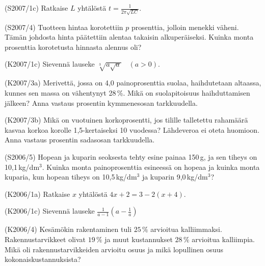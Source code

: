 \begin{tehtava}(S2007/1c)  Ratkaise $L$ yhtälöstä $t=\frac{1}{2\pi\sqrt{LC}}$.
\end{tehtava}

\begin{tehtava}(S2007/4)   Tuotteen hintaa korotettiin $p$ prosenttia, jolloin menekki väheni. Tämän johdosta hinta päätettiin alentaa takaisin alkuperäiseksi. Kuinka monta prosenttia korotetusta hinnasta alennus oli?
\end{tehtava}

\begin{tehtava}(K2007/1c)  Sievennä lauseke $ \sqrt[3]{a \sqrt{a}} \quad (a > 0) $.
\end{tehtava}

\begin{tehtava}(K2007/3a)  Merivettä, jossa on 4,0 painoprosenttia suolaa, haihdutetaan altaassa, kunnes sen massa on vähentynyt 28\,\%. Mikä on suolapitoisuus haihduttamisen jälkeen? Anna vastaus prosentin kymmenesosan tarkkuudella. 
\end{tehtava}

\begin{tehtava}(K2007/3b)  Mikä on vuotuinen korkoprosentti, jos tilille talletettu rahamäärä
                        kasvaa korkoa korolle 1,5-kertaiseksi 10 vuodessa? Lähdeveroa
                        ei oteta huomioon. Anna vastaus prosentin sadasosan 
                        tarkkuudella.
\end{tehtava}

\begin{tehtava}(S2006/5)   Hopean ja kuparin seoksesta tehty esine painaa 150\,g, ja sen
                       tiheys on 10,1\,kg/dm\(^3\). Kuinka monta painoprosenttia 
                        esineessä on hopeaa ja kuinka monta kuparia, kun hopean tiheys on 
                        10,5\,kg/dm\(^3\) ja kuparin 9,0\,kg/dm\(^3\)?
\end{tehtava}

\begin{tehtava}(K2006/1a)  Ratkaise $x$ yhtälöstä $4x + 2 =  3 - 2(x + 4)$.
\end{tehtava}

\begin{tehtava}(K2006/1c)  Sievennä lauseke 
                        $ \frac{1}{a - 1} \left( a - \frac{1}{a} \right) $
\end{tehtava}

\begin{tehtava}(K2006/4)   Kesämökin rakentaminen tuli $25\,\%$ arvioitua kalliimmaksi.
 Rakennustarvikkeet olivat $19\,\%$ ja muut kustannukset $28\,\% $
                        arvioitua kalliimpia. Mikä oli rakennustarvikkeiden arvioitu osuus ja 
                        mikä lopullinen osuus kokonaiskustannuksista?
\end{tehtava}

